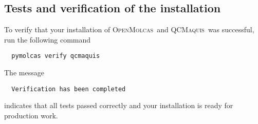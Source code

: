 \documentclass[bibliography=totoc,12pt,a4paper]{scrartcl}
\newcommand{\mol}{\textsc{OpenMolcas}}
\newcommand{\qcm}{\textsc{QCMaquis}}
\begin{document}

\subsection{Tests and verification of the installation}

To verify that your installation of \mol\ and \qcm\ was successful, run the following command

\begin{verbatim}
  pymolcas verify qcmaquis
\end{verbatim}

\noindent The message

\begin{verbatim}
  Verification has been completed
\end{verbatim}

\noindent indicates that all tests passed correctly and your installation is ready for production work.
\vspace{2ex}
\end{document}
